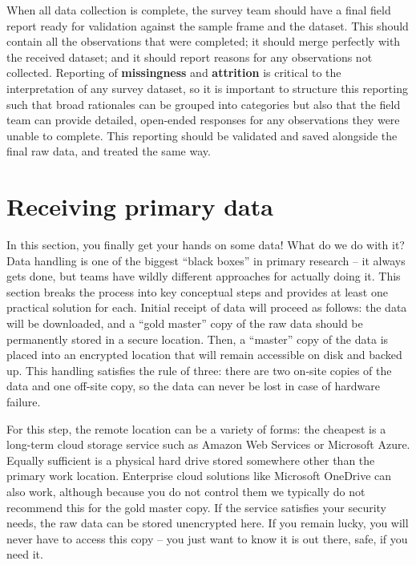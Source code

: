 When all data collection is complete,
the survey team should have a final field report
ready for validation against the sample frame and the dataset.
This should contain all the observations that were completed;
it should merge perfectly with the received dataset;
and it should report reasons for any observations not collected.
Reporting of \textbf{missingness} and \textbf{attrition} is critical
to the interpretation of any survey dataset,
so it is important to structure this reporting
such that broad rationales can be grouped into categories
but also that the field team can provide detailed, open-ended responses
for any observations they were unable to complete.
This reporting should be validated and saved
alongside the final raw data, and treated the same way.



\section{Receiving primary data}

In this section, you finally get your hands on some data!
What do we do with it? Data handling is one of the biggest
``black boxes'' in primary research -- it always gets done,
but teams have wildly different approaches for actually doing it.
This section breaks the process into key conceptual steps
and provides at least one practical solution for each.
Initial receipt of data will proceed as follows:
the data will be downloaded, and a ``gold master'' copy
of the raw data should be permanently stored in a secure location.
Then, a ``master'' copy of the data is placed into an encrypted location
that will remain accessible on disk and backed up.
This handling satisfies the rule of three:
there are two on-site copies of the data and one off-site copy,
so the data can never be lost in case of hardware failure.

For this step, the remote location can be a variety of forms:
the cheapest is a long-term cloud storage service
such as Amazon Web Services or Microsoft Azure.
Equally sufficient is a physical hard drive
stored somewhere other than the primary work location.
Enterprise cloud solutions like Microsoft OneDrive
can also work, although because you do not control them
we typically do not recommend this for the gold master copy.
If the service satisfies your security needs,
the raw data can be stored unencrypted here.
If you remain lucky, you will never have to access this copy --
you just want to know it is out there, safe, if you need it.

